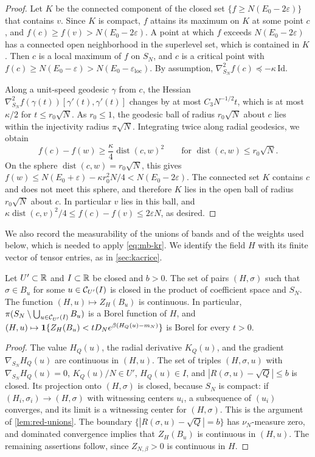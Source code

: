 \begin{proof}
Let $K$ be the connected component of the closed set $\{f\ge N(E_0-2\varepsilon)\}$ that contains $v$. Since $K$ is compact, $f$ attains its maximum on $K$ at some point $c$, and $f(c)\ge f(v)>N(E_0-2\varepsilon)$. A point at which $f$ exceeds $N(E_0-2\varepsilon)$ has a connected open neighborhood in the superlevel set, which is contained in $K$. Then $c$ is a local maximum of $f$ on $S_N$, and $c$ is a critical point with $f(c)\ge N(E_0-\varepsilon)>N(E_0-\varepsilon_{\mathrm{loc}})$. By assumption, $\nabla^2_{S_N}f(c)\preceq-\kappa\,\mathrm{Id}$.

Along a unit-speed geodesic $\gamma$ from $c$, the Hessian $\nabla^2_{S_N}f(\gamma(t))[\gamma'(t),\gamma'(t)]$ changes by at most $C_3N^{-1/2}t$, which is at most $\kappa/2$ for $t\le r_0\sqrt N$. As $r_0\le1$, the geodesic ball of radius $r_0\sqrt N$ about $c$ lies within the injectivity radius $\pi\sqrt N$. Integrating twice along radial geodesics, we obtain
\[
f(c)-f(w)\ge\frac\kappa4\operatorname{dist}(c,w)^2\qquad\text{for }\operatorname{dist}(c,w)\le r_0\sqrt N .
\]
On the sphere $\operatorname{dist}(c,w)=r_0\sqrt N$, this gives $f(w)\le N(E_0+\varepsilon)-\kappa r_0^2N/4<N(E_0-2\varepsilon)$. The connected set $K$ contains $c$ and does not meet this sphere, and therefore $K$ lies in the open ball of radius $r_0\sqrt N$ about $c$. In particular $v$ lies in this ball, and $\kappa\operatorname{dist}(c,v)^2/4\le f(c)-f(v)\le2\varepsilon N$, as desired.
\end{proof}

We also record the measurability of the unions of bands and of the weights used below, which is needed to apply \eqref{eq:mb-kr}. We identify the field $H$ with its finite vector of tensor entries, as in \cref{sec:kacrice}.

\begin{lemma}[Measurability]\label{lem:mb-borel}
Let $U'\subset\mathbb R$ and $I\subset\mathbb R$ be closed and $b>0$. The set of pairs $(H,\sigma)$ such that $\sigma\in B_u$ for some $u\in\mathcal C_{U'}(I)$ is closed in the product of coefficient space and $S_N$. The function $(H,u)\mapsto Z_H(B_u)$ is continuous. In particular, $\pi(S_N\setminus\bigcup_{u\in\mathcal C_{U'}(I)}B_u)$ is a Borel function of $H$, and $(H,u)\mapsto\mathbf 1\{Z_H(B_u)<tD_Ne^{\beta(H_Q(u)-m_N)}\}$ is Borel for every $t>0$.
\end{lemma}

\begin{proof}
The value $H_Q(u)$, the radial derivative $K_Q(u)$, and the gradient $\nabla_{S_N}H_Q(u)$ are continuous in $(H,u)$. The set of triples $(H,\sigma,u)$ with $\nabla_{S_N}H_Q(u)=0$, $K_Q(u)/N\in U'$, $H_Q(u)\in I$, and $|R(\sigma,u)-\sqrt Q|\le b$ is closed. Its projection onto $(H,\sigma)$ is closed, because $S_N$ is compact: if $(H_i,\sigma_i)\to(H,\sigma)$ with witnessing centers $u_i$, a subsequence of $(u_i)$ converges, and its limit is a witnessing center for $(H,\sigma)$. This is the argument of \cref{lem:red-unions}. The boundary $\{|R(\sigma,u)-\sqrt Q|=b\}$ has $\nu_N$-measure zero, and dominated convergence implies that $Z_H(B_u)$ is continuous in $(H,u)$. The remaining assertions follow, since $Z_{N,\beta}>0$ is continuous in $H$.
\end{proof}

